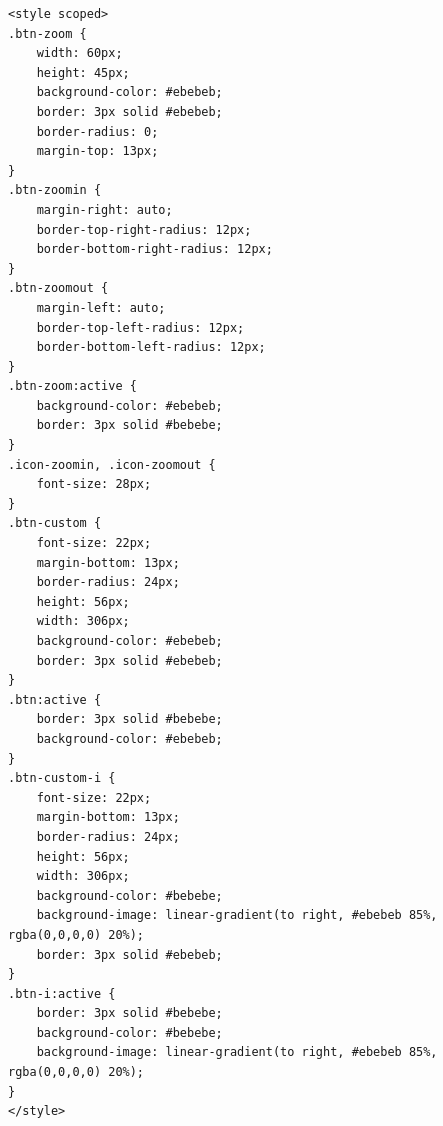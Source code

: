 \documentclass[oneside,14pt]{extarticle}
\begin{document}
\begin{normalsize}
\begin{tiny}
\begin{lstlisting}
<style scoped>
.btn-zoom {
	width: 60px;
	height: 45px;
	background-color: #ebebeb;
	border: 3px solid #ebebeb;
	border-radius: 0;
	margin-top: 13px;
}
.btn-zoomin {
	margin-right: auto;
	border-top-right-radius: 12px;
	border-bottom-right-radius: 12px;
}
.btn-zoomout {
	margin-left: auto;
	border-top-left-radius: 12px;
	border-bottom-left-radius: 12px;
}
.btn-zoom:active {
	background-color: #ebebeb;
	border: 3px solid #bebebe;
}
.icon-zoomin, .icon-zoomout {
	font-size: 28px;
}
.btn-custom {
	font-size: 22px;
	margin-bottom: 13px;
	border-radius: 24px;
	height: 56px;
	width: 306px;
	background-color: #ebebeb;
	border: 3px solid #ebebeb;
}
.btn:active {
	border: 3px solid #bebebe;
	background-color: #ebebeb;
}
.btn-custom-i {
	font-size: 22px;
	margin-bottom: 13px;
	border-radius: 24px;
	height: 56px;
	width: 306px;
	background-color: #bebebe; 
	background-image: linear-gradient(to right, #ebebeb 85%, rgba(0,0,0,0) 20%); 
	border: 3px solid #ebebeb;
}
.btn-i:active {
	border: 3px solid #bebebe;
	background-color: #bebebe;
	background-image: linear-gradient(to right, #ebebeb 85%, rgba(0,0,0,0) 20%); 
}
</style>
		\end{lstlisting}
		\end{tiny}

\end{normalsize}
\end{document}
